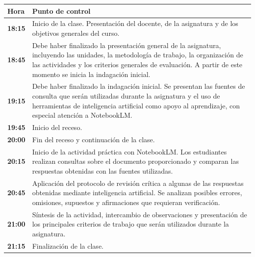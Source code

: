 \documentclass[10pt]{article}
\begin{document}
\begin{center}
\renewcommand{\arraystretch}{1.3}

\begin{tabular}{|p{2.3cm}|p{9.7cm}|}
\hline
\textbf{Hora} & \textbf{Punto de control} \\
\hline

\textbf{18:15} &
Inicio de la clase. Presentación del docente, de la asignatura y de los
objetivos generales del curso. \\
\hline

\textbf{18:45} &
Debe haber finalizado la presentación general de la asignatura,
incluyendo las unidades, la metodología de trabajo, la organización
de las actividades y los criterios generales de evaluación.
A partir de este momento se inicia la indagación inicial. \\
\hline

\textbf{19:15} &
Debe haber finalizado la indagación inicial. Se presentan las fuentes
de consulta que serán utilizadas durante la asignatura y el uso de
herramientas de inteligencia artificial como apoyo al aprendizaje,
con especial atención a NotebookLM. \\
\hline

\textbf{19:45} &
Inicio del receso. \\
\hline

\textbf{20:00} &
Fin del receso y continuación de la clase. \\
\hline

\textbf{20:15} &
Inicio de la actividad práctica con NotebookLM. Los estudiantes realizan
consultas sobre el documento proporcionado y comparan las respuestas
obtenidas con las fuentes utilizadas. \\
\hline

\textbf{20:45} &
Aplicación del protocolo de revisión crítica a algunas de las respuestas
obtenidas mediante inteligencia artificial. Se analizan posibles errores,
omisiones, supuestos y afirmaciones que requieran verificación. \\
\hline

\textbf{21:00} &
Síntesis de la actividad, intercambio de observaciones y presentación
de los principales criterios de trabajo que serán utilizados durante
la asignatura. \\
\hline

\textbf{21:15} &
Finalización de la clase. \\
\hline

\end{tabular}
\end{center}
\end{document}
